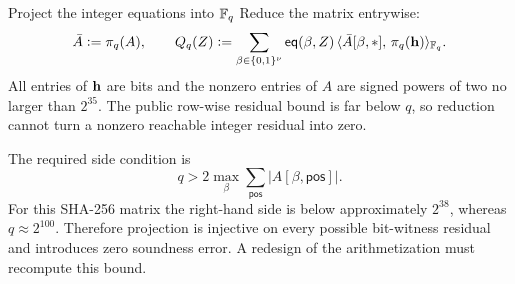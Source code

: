\begin{step}{Project the integer equations into $\mathbb{F}_q$}{%
}\label{step:project}
Reduce the matrix entrywise:
\[
  \bar A\vcentcolon=\pi_q(A),
  \qquad
  Q_q(Z)
  \vcentcolon=
  \sum_{\beta\in\{0,1\}^{\nu}}
    \mathsf{eq}(\beta,Z)\,\langle \bar A[\beta,*],\, \pi_q(\mathbf{h})\rangle_{\mathbb{F}_q}.
\]
All entries of $\mathbf{h}$ are bits and the nonzero entries of $A$ are signed powers
of two no larger than $2^{35}$.  The public row-wise residual bound is far below
$q$, so reduction cannot turn a nonzero reachable integer residual into zero.

\begin{remark}\label{warn:fixedq}
The required side condition is
\[
  q>2\max_{\beta}\sum_{\mathsf{pos}}|A[\beta,\mathsf{pos}]|.
\]
For this SHA-256 matrix the right-hand side is below approximately $2^{38}$,
whereas $q\approx2^{100}$.  Therefore projection is injective on every possible
bit-witness residual and introduces zero soundness error.  A redesign of the
arithmetization must recompute this bound.
\end{remark}

\end{step}

